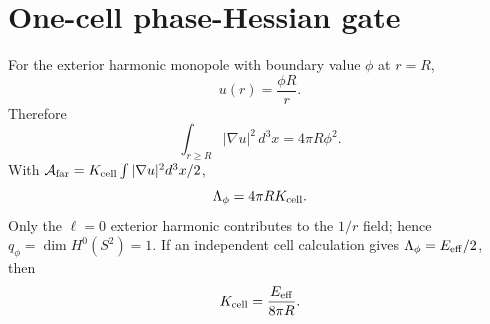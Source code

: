 \section{One-cell phase-Hessian gate}
For the exterior harmonic monopole with boundary value \(\phi\) at \(r=R\),
\[
  u(r)=\frac{\phi R}{r}.
\]
Therefore
\[
  \int_{r\ge R}|\nabla u|^2\,d^3x = 4\pi R\phi^2.
\]
With \(\mathcal A_{\rm far}=K_{\rm cell}\int |\nabla u|^2d^3x/2\),
\[
  \Lambda_\phi=4\pi R K_{\rm cell}.
\]
Only the \(\ell=0\) exterior harmonic contributes to the \(1/r\) field; hence
\(q_\phi=\dim H^0(S^2)=1\). If an independent cell calculation gives
\(\Lambda_\phi=E_{\rm eff}/2\), then
\[
  K_{\rm cell}=\frac{E_{\rm eff}}{8\pi R}.
\]
